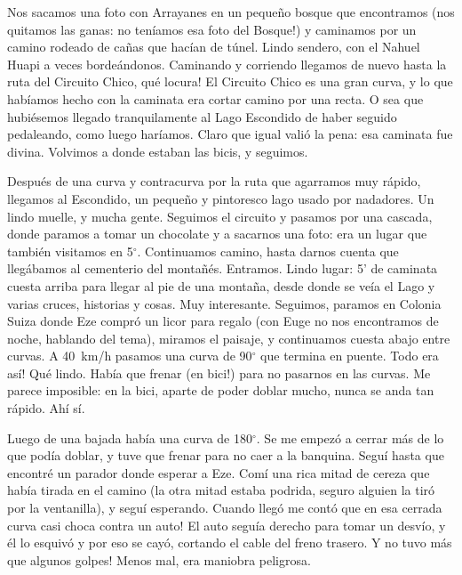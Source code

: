 Nos sacamos una foto con Arrayanes en un peque\~no bosque que encontramos (nos
quitamos las ganas: \textexclamdown no ten\'iamos esa foto del Bosque!) y
caminamos por un camino rodeado de ca\~nas que hac\'ian de t\'unel. Lindo
sendero, con el Nahuel Huapi a veces borde\'andonos. Caminando y corriendo
llegamos de nuevo hasta la ruta del Circuito Chico, \textexclamdown qu\'e
locura! El Circuito Chico es una gran curva, y lo que hab\'iamos hecho con la
caminata era cortar camino por una recta. O sea que hubi\'esemos llegado
tranquilamente al Lago Escondido de haber seguido pedaleando, como luego
har\'iamos. Claro que igual vali\'o la pena: esa caminata fue divina. Volvimos a
donde estaban las bicis, y seguimos.

Despu\'es de una curva y contracurva por la ruta que agarramos muy r\'apido,
llegamos al Escondido, un peque\~no y pintoresco lago usado por nadadores. Un
lindo muelle, y mucha gente. Seguimos el circuito y pasamos por una cascada,
donde paramos a tomar un chocolate y a sacarnos una foto: era un lugar que
tambi\'en visitamos en 5$^\circ$. Continuamos camino, hasta darnos cuenta que
lleg\'abamos al cementerio del monta\~n\'es. Entramos. Lindo lugar: 5' de
caminata cuesta arriba para llegar al pie de una monta\~na, desde donde se
ve\'ia el Lago y varias cruces, historias y cosas. Muy interesante. Seguimos,
paramos en Colonia Suiza donde Eze compr\'o un licor para regalo (con Euge no
nos encontramos de noche, hablando del tema), miramos el paisaje, y continuamos
cuesta abajo entre curvas. A 40~km/h pasamos una curva de 90$^\circ$ que termina
en puente. \textexclamdown Todo era as\'i! Qu\'e lindo. Hab\'ia que frenar
(\textexclamdown en bici!) para no pasarnos en las curvas. Me parece imposible:
en la bici, aparte de poder doblar mucho, nunca se anda tan r\'apido. Ah\'i
s\'i.

Luego de una bajada hab\'ia una curva de 180$^\circ$. Se me empez\'o a cerrar
m\'as de lo que pod\'ia doblar, y tuve que frenar para no caer a la banquina.
Segu\'i hasta que encontr\'e un parador donde esperar a Eze. Com\'i una rica
mitad de cereza que hab\'ia tirada en el camino (la otra mitad estaba podrida,
seguro alguien la tir\'o por la ventanilla), y segu\'i esperando.
\textexclamdown Cuando lleg\'o me cont\'o que en esa cerrada curva casi choca
contra un auto! El auto segu\'ia derecho para tomar un desv\'io, y \'el lo
esquiv\'o y por eso se cay\'o, cortando el cable del freno trasero.
\textexclamdown Y no tuvo m\'as que algunos golpes! Menos mal, era maniobra
peligrosa.

